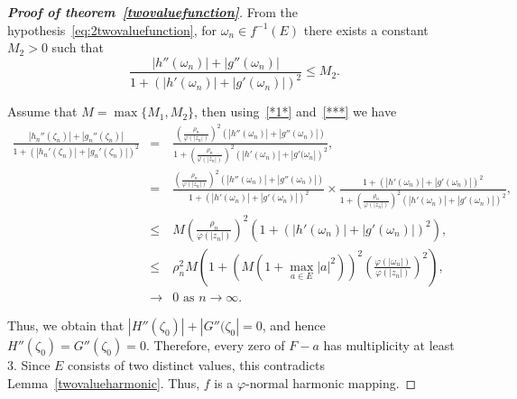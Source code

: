 \documentclass[11pt, reqno]{amsart}
\numberwithin{equation}{section}
\theoremstyle{definition}
\theoremstyle{remark}
\theoremstyle{plain}
\begin{document}
\begin{proof}[\bf{Proof of theorem~\ref{twovaluefunction}}]
From the hypothesis~\ref{eq:2twovaluefunction}, for 
$\omega_n\in f^{-1}(E)$ there exists a constant $M_2>0$ such that
\begin{equation}\label{***}
  \frac{|h''(\omega_n)|+|g''(\omega_n)|}
{1+(|h'(\omega_n)|+|g'(\omega_n)|)^2}\leq M_2.
\end{equation}

Assume that $M=\max\{M_1, M_2\}$, then using~\eqref{*1*} and~\eqref{***} we have
\begin{eqnarray*}
  \frac{|h_n''(\zeta_n)|+|g_n''(\zeta_n)|}
  {1+(|h_n'(\zeta_n)|+|g_n'(\zeta_n)|)^2} 
  &=& \frac{\left(\frac{\rho_n}{\varphi(|z_n|)}
  \right)^2\left(|h''(\omega_n)|
  +|g''(\omega_n)|\right)}{1+\left(\frac{\rho_n}
  {\varphi(|z_n|)}\right)^2\left(|h'(\omega_n)|+
  |g'(\omega_n|\right)^2}, \\
  &=& \frac{\left(\frac{\rho_n}{\varphi(|z_n|)}\right)^2
  \left(|h''(\omega_n)|+|g''(\omega_n)|\right)}
  {1+\left(|h'(\omega_n)|+|g'(\omega_n)|\right)^2}\!\times\!
  \frac{1+\left(|h'(\omega_n)|+|g'(\omega_n)|\right)^2}
  {1+\left(\frac{\rho_n}{\varphi(|z_n|)}\right)^2
  \left(|h'(\omega_n)|+|g'(\omega_n)|\right)^2}, \\
   &\leq& M \left(\frac{\rho_n}{\varphi(|z_n|)}\right)^2
   (1+\left(|h'(\omega_n)|+|g'(\omega_n)|\right)^2),\\
  &\leq& \rho_n^2 M \left(1+(M(1+\max_{a\in E}|a|^2))^2\left(\frac{\varphi(|\omega_n|)}
  {\varphi(|z_n|)}\right)^2\right), \\
  &\to & 0 \,\, \text{as}\,\, n \to \infty.
\end{eqnarray*}

Thus, we obtain that $|H''(\zeta_0)|+|G''(\zeta_0|=0$, and hence
 $H''(\zeta_0)=G''(\zeta_0)=0$. Therefore, every
 zero of $F-a$ has multiplicity at least 3. Since $E$ consists of 
 two distinct values, this contradicts Lemma~\ref{twovalueharmonic}.
Thus, $f$ is a $\varphi$-normal harmonic mapping.  
\end{proof}
\medskip
\end{document}
